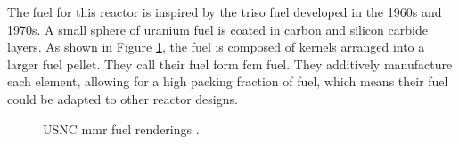The fuel for this reactor is inspired by the \gls{triso} fuel developed in the 1960s and 1970s. A small sphere of uranium fuel is coated in carbon and silicon carbide layers. As shown in Figure \ref{fig:usnc_fuel}, the fuel is composed of kernels arranged into a larger fuel pellet. They call their fuel form \gls{fcm} fuel. They additively manufacture each element, allowing for a high packing fraction of fuel, which means their fuel could be adapted to other reactor designs.

\begin{figure}[H]
    \hfill
    \caption{
    USNC \gls{mmr} fuel renderings
      \cite{usnc_media_kit}.}
    \label{fig:usnc_fuel}
\end{figure}

